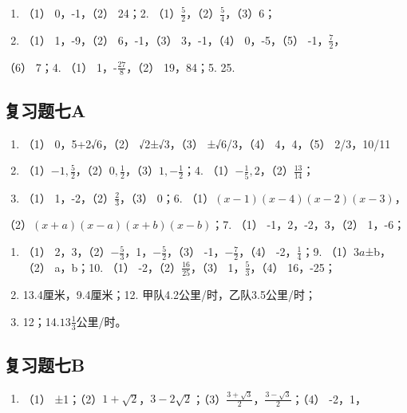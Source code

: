 \begin{enumerate}
\item
  （1） 0，-1，（2） 24；2.
  （1）\(\frac{5}{2}\)，（2）\(\frac{5}{4}\)，（3）\(6\)；
\item
  （1） 1，-9，（2） 6，-1，（3） 3，-1，（4） 0，-5，（5）
  -1，\(\frac{7}{2}\)，
\end{enumerate}

（6） 7；4. （1） 1，-\(\frac{27}{8}\)，（2） 19，84；5. 25.

\subsection{复习题七A}

\begin{enumerate}[start=2]
\item
  （1） 0，5+2√6，（2） √2±√3，（3） ±√6/3，（4） 4，4，（5） 2/3，10/11
\item
  （1）\(-1, \frac{5}{2}\)，（2）\(0, \frac{1}{2}\)，（3）\(1, -\frac{1}{2}\)；4.
  （1）\(-\frac{1}{5}, 2\)，（2）\(\frac{13}{14}\)；
\item
  （1） 1，-2，（2）\(\frac{2}{3}\)，（3） 0；6.
  （1）\((x - 1)(x - 4)(x - 2)(x - 3)\)，
\end{enumerate}

（2）\((x + a)(x - a)(x + b)(x - b)\)；7. （1） -1，2，-2，3，（2）
1，-6；

\begin{enumerate}[start=8]
\item
  （1） 2，3，（2）\(-\frac{5}{3}\)，1，\(-\frac{5}{2}\)，（3）
  -1，\(-\frac{7}{2}\)，（4） -2，\(\frac{1}{4}\)；9.
  （1）\(3a\)±b，（2） a，b；10. （1） -2，（2）\(\frac{16}{25}\)，（3）
  1，\(\frac{5}{3}\)，（4） 16，-25；
\item
  13.4厘米，9.4厘米；12. 甲队4.2公里/时，乙队3.5公里/时；
\item
  12；14.\(13\frac{1}{3}\)公里/时。
\end{enumerate}

\subsection{复习题七B}

\begin{enumerate}
\item
  （1）
  ±1；（2）\(1 + \sqrt{2}\)，\(3 - 2\sqrt{2}\)；（3）\(\frac{3 + \sqrt{3}}{2}\)，\(\frac{3 - \sqrt{3}}{2}\)；（4）
  -2，1，
\end{enumerate}

